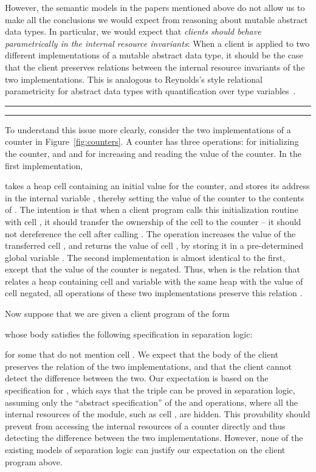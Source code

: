 \documentclass{LMCS}
\begin{document}
However, the semantic models in the papers mentioned 
above do not allow us to make all the conclusions we would expect from
reasoning about mutable abstract data types. 
In particular, we would expect that \emph{clients should behave parametrically 
in the internal resource invariants}: When a client is applied to 
two different implementations of a mutable abstract data type, 
it should be the case that the client preserves 
relations between the internal resource invariants of the two
implementations. This is analogous to Reynolds's style 
relational parametricity for abstract data types with quantification over
type variables~\cite{reynolds}.

\begin{figure*}[t]
\hrule




\hrule
\caption{Counter Modules}
\label{fig:counters}
\end{figure*}

To understand this issue more clearly, 
consider the two implementations of a counter 
in Figure~\ref{fig:counters}.
A counter has three operations: 
 for initializing the counter, 
and  and  for increasing and reading
the value of the counter.
In the first implementation, 

takes a heap cell  containing
an initial value for the counter, and stores its address  
in the internal variable , thereby setting the value
of the counter to the contents of . The intention is that
when a client program calls this 
initialization routine with cell , it should
transfer the ownership of the cell to the counter -- 
it should not dereference the cell after calling .
The operation  increases the value of 
the transferred cell , and  returns
the value of cell , by storing it in a pre-determined
global variable . The second 
implementation is almost identical to the first, except that
the value of the counter is negated. Thus, when
 is the relation that relates a heap containing 
cell  and variable  with the same heap with the value of 
cell 
negated, all operations of these two implementations preserve
this relation .

Now suppose that we are given a client program of the form

whose body  satisfies the following
specification in separation logic:

for some  that do not mention cell .
We expect that the body  of the client preserves the relation  of the
two implementations, and that the client cannot detect the difference
between the two. Our expectation is based on the specification for ,
which says that the triple  can be proved in
separation logic, assuming only the ``abstract specification'' of the
 and  operations, where all the internal resources of the
module, such as cell , are hidden. This provability should prevent 
from accessing the internal resources of a counter directly and thus
detecting the difference between the two implementations.  However, none of the
existing models of separation logic can justify our expectation on the
client program above.
\end{document}
